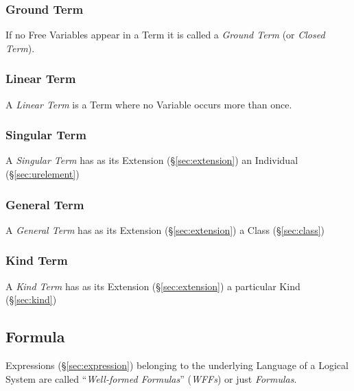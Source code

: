 \subsubsection{Ground Term}\label{sec:ground_term}

If no Free Variables appear in a Term it is called a \emph{Ground
  Term} (or \emph{Closed Term}).



\subsubsection{Linear Term}\label{sec:linear_term}

A \emph{Linear Term} is a Term where no Variable occurs more than
once.



\subsubsection{Singular Term}\label{sec:singular_term}
\cite{chalmers02}

A \emph{Singular Term} has as its Extension (\S\ref{sec:extension}) an
Individual (\S\ref{sec:urelement})



\subsubsection{General Term}\label{sec:general_term}
\cite{chalmers02}

A \emph{General Term} has as its Extension (\S\ref{sec:extension}) a
Class (\S\ref{sec:class})



\subsubsection{Kind Term}\label{sec:kind_term}
\cite{chalmers02}

A \emph{Kind Term} has as its Extension (\S\ref{sec:extension}) a
particular Kind (\S\ref{sec:kind})




\subsection{Formula}\label{sec:formula}

Expressions (\S\ref{sec:expression}) belonging to the underlying
Language of a Logical System are called ``\emph{Well-formed
  Formulas}'' (\emph{WFFs}) or just \emph{Formulas}.

